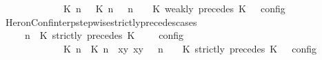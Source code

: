\begin{isabellebody}
\ \ \ \ \ \ \ \ \ \ {\isacharequal}\ {\isasymlbrakk}\ {\isacharparenleft}{\isacharparenleft}{\isacharparenleft}{\isacharhash}\isactrlsup {\isasymle}\ K\ n{\isacharparenright}\ {\isasympreceq}\ {\isacharparenleft}{\isacharhash}\isactrlsup {\isasymle}\ K\ n{\isacharparenright}{\isacharparenright}\ {\isacharhash}\ {\isasymGamma}{\isacharparenright}{\isacharcomma}\ n\ {\isasymturnstile}\ {\isasymPsi}\ {\isasymtriangleright}\ {\isacharparenleft}{\isacharparenleft}K\ weakly\ precedes\ K\ {\isacharhash}\ {\isasymPhi}{\isacharparenright}\ {\isasymrbrakk}\isactrlsub c\isactrlsub o\isactrlsub n\isactrlsub f\isactrlsub i\isactrlsub g{\isacartoucheclose}\isanewline
%
\isadelimproof
\ \ %
\endisadelimproof
%
\isatagproof
{}\isamarkupfalse%
%
\endisatagproof
{\isafoldproof}%
%
\isadelimproof
\isanewline
%
\endisadelimproof
\isanewline
{}\isamarkupfalse%
\ HeronConf{\isacharunderscore}interp{\isacharunderscore}stepwise{\isacharunderscore}strictly{\isacharunderscore}precedes{\isacharunderscore}cases{\isacharcolon}\isanewline
\ \ \ {\isacartoucheopen}{\isasymlbrakk}\ {\isasymGamma}{\isacharcomma}\ n\ {\isasymturnstile}\ {\isacharparenleft}{\isacharparenleft}K\ strictly\ precedes\ K\ {\isacharhash}\ {\isasymPsi}{\isacharparenright}\ {\isasymtriangleright}\ {\isasymPhi}\ {\isasymrbrakk}\isactrlsub c\isactrlsub o\isactrlsub n\isactrlsub f\isactrlsub i\isactrlsub g\isanewline
\ \ \ \ \ \ \ \ \ \ {\isacharequal}\ {\isasymlbrakk}\ {\isacharparenleft}{\isacharparenleft}{\isasymlceil}{\isacharhash}\isactrlsup {\isasymle}\ K\ n{\isacharcomma}\ {\isacharhash}\isactrlsup {\isacharless}\ K\ n{\isasymrceil}\ {\isasymin}\ {\isacharparenleft}{\isasymlambda}{\isacharparenleft}x{\isacharcomma}y{\isacharparenright}{\isachardot}\ x{\isasymle}y{\isacharparenright}{\isacharparenright}\ {\isacharhash}\ {\isasymGamma}{\isacharparenright}{\isacharcomma}\ n\ {\isasymturnstile}\ {\isasymPsi}\ {\isasymtriangleright}\ {\isacharparenleft}{\isacharparenleft}K\ strictly\ precedes\ K\ {\isacharhash}\ {\isasymPhi}{\isacharparenright}\ {\isasymrbrakk}\isactrlsub c\isactrlsub o\isactrlsub n\isactrlsub f\isactrlsub i\isactrlsub g{\isacartoucheclose}\isanewline
%
\isadelimproof
\ \ %
\endisadelimproof
%
\isatagproof
{}\isamarkupfalse%

\end{isabellebody}
